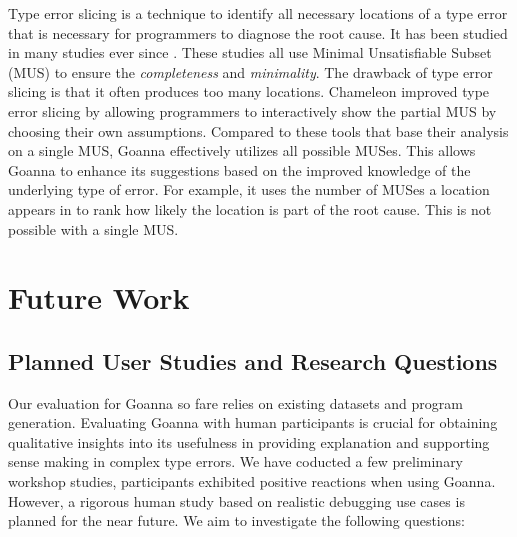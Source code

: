 \documentclass[pdflatex,sn-nature,Numbered]{sn-jnl}%
\begin{document}
Type error slicing \cite{Haack2004-fr} is a technique to identify all necessary locations of a type error that is necessary for programmers to diagnose the root cause. It has been studied in many studies ever since \cite{Tip2001-qn, Heeren2003-kd}. These studies all use Minimal Unsatisfiable Subset (MUS) to ensure the \textit{completeness} and \textit{minimality}. The drawback of type error slicing is that it often produces too many locations.  Chameleon \cite{Stuckey2003-pz,Fu2021-xd} improved type error slicing by allowing programmers to interactively show the partial MUS by choosing their own assumptions. Compared to these tools that base their analysis on a single MUS, Goanna effectively utilizes all possible MUSes. This allows Goanna to enhance its suggestions based on the improved knowledge of the underlying type of error. For example, it uses the number of MUSes a location appears in to rank how likely the location is part of the root cause. This is not possible with a single MUS.  

\section{Future Work}\label{sec:future-work}

\subsection{Planned User Studies and Research Questions}

Our evaluation for Goanna so fare relies on existing datasets and program generation. Evaluating Goanna with human participants is crucial for obtaining qualitative insights into its usefulness in providing explanation and supporting sense making in complex type errors. We have coducted a few preliminary workshop studies, participants exhibited positive reactions when using Goanna. However, a rigorous human study based on realistic debugging use cases is planned for the near future. We aim to investigate the following questions:

\end{document}
